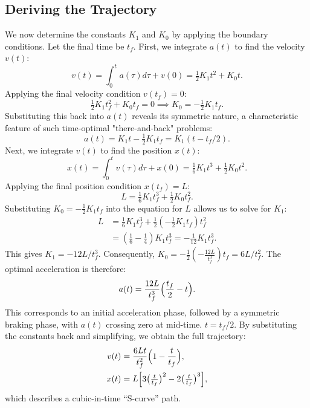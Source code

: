 \documentclass[journal, a4paper]{IEEEtran}
\begin{document}
\subsection{Deriving the Trajectory}
We now determine the constants $K_1$ and $K_0$ by applying the boundary conditions. Let the final time be $t_f$. First, we integrate $a(t)$ to find the velocity $v(t)$:
\begin{equation}
    v(t) = \int_0^t a(\tau) d\tau + v(0) = \tfrac{1}{2} K_1 t^2 + K_0 t.
\end{equation}
Applying the final velocity condition $v(t_f)=0$:
\begin{equation}
    \tfrac{1}{2} K_1 t_f^2 + K_0 t_f = 0 \implies K_0 = -\tfrac{1}{2} K_1 t_f.
\end{equation}
Substituting this back into $a(t)$ reveals its symmetric nature, a characteristic feature of such time-optimal "there-and-back" problems:
\begin{equation}
    a(t) = K_1 t - \tfrac{1}{2} K_1 t_f = K_1 (t - t_f/2).
\end{equation}
Next, we integrate $v(t)$ to find the position $x(t)$:
\begin{equation}
    x(t) = \int_0^t v(\tau) d\tau + x(0) = \tfrac{1}{6} K_1 t^3 + \tfrac{1}{2} K_0 t^2.
\end{equation}
Applying the final position condition $x(t_f)=L$:
\begin{equation}
    L = \tfrac{1}{6} K_1 t_f^3 + \tfrac{1}{2} K_0 t_f^2.
\end{equation}
Substituting $K_0 = -\frac{1}{2} K_1 t_f$ into the equation for $L$ allows us to solve for $K_1$:
\begin{align}
    L &= \tfrac{1}{6} K_1 t_f^3 + \tfrac{1}{2}(-\tfrac{1}{2}K_1 t_f)t_f^2 \nonumber\\
      &= (\tfrac{1}{6} - \tfrac{1}{4})K_1 t_f^3 = -\tfrac{1}{12} K_1 t_f^3.
\end{align}
This gives $K_1 = -12L/t_f^3$. Consequently, $K_0 = -\frac{1}{2}(-\frac{12L}{t_f^3})t_f = 6L/t_f^2$.
The optimal acceleration is therefore:
\begin{equation}
  a(t)=\frac{12L}{t_f^{3}}\Bigl(\frac{t_f}{2}-t\Bigr).
  \label{eq:a_linear}
\end{equation}
This corresponds to an initial acceleration phase, followed by a symmetric braking phase, with 
$a(t)$ crossing zero at mid-time. $t=t_f/2$. By substituting the constants back and simplifying, we obtain the full trajectory:
\begin{align}
  v(t) &= \frac{6Lt}{t_f^2}\Bigl(1-\frac{t}{t_f}\Bigr),
         \label{eq:v_free_corrected}\\
  x(t) &= L\Bigl[3\bigl(\tfrac{t}{t_f}\bigr)^{2}
                   -2\bigl(\tfrac{t}{t_f}\bigr)^{3}\Bigr],
         \label{eq:x_free}
\end{align}
which describes a cubic-in-time ``S-curve'' path.
\end{document}
